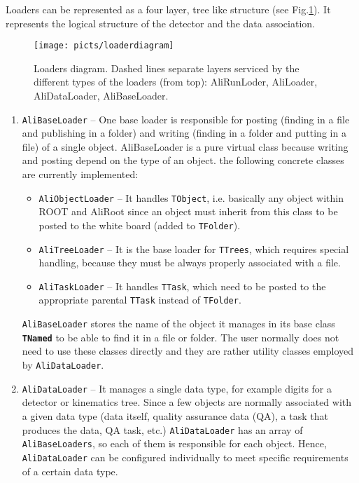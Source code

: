 \documentclass[12pt,a4paper,twoside]{article}
\newcommand{\class}[1]{\texttt{\textbf{#1}}\xspace}
\begin{document}
{Loaders can be represented as a four layer, tree like structure
(see Fig.\ref{cap:soft:loaderdiagram}). It represents the logical structure of
the detector and the data association.
% 
\begin{figure}
  \begin{center}
    \texttt{[image: picts/loaderdiagram]}
  \end{center}
  \caption
  {Loaders diagram. Dashed lines separate layers serviced by  the different types of
    the loaders (from top): AliRunLoder, AliLoader, AliDataLoader, AliBaseLoader.
    \label{cap:soft:loaderdiagram}}
\end{figure}


\begin{enumerate}

\item \texttt{AliBaseLoader} -- One base loader is responsible for posting 
  (finding in a file and publishing in a folder) and writing 
  (finding in a folder and putting in a file) of a single object. 
  AliBaseLoader is a pure virtual class because writing and 
  posting depend on the type of an object. the following concrete classes are currently implemented:
  \begin{itemize}
  \item \texttt{AliObjectLoader} -- It handles \texttt{TObject}, i.e. basically any object 
    within ROOT and AliRoot since an object must inherit from 
    this class to be posted to the white board 
    (added to \texttt{TFolder}).

  \item \texttt{AliTreeLoader}   -- It is the base loader for \texttt{TTrees}, 
    which requires special
    handling, because they must be always properly 
    associated with a file.

  \item \texttt{AliTaskLoader}  -- It handles \texttt{TTask}, which need to be posted to the 
    appropriate parental \texttt{TTask} instead of \texttt{TFolder}.
  \end{itemize}
  \texttt{AliBaseLoader} stores the name of the object it manages in
  its base class \class{TNamed} to be able
  to find it in a file or folder. The user normally does not need to use
  these classes directly and they are rather utility classes employed by
  \texttt{AliDataLoader}.

\item \texttt{AliDataLoader} -- It manages a single data type, for example digits for
  a detector or kinematics tree. 
  Since a few objects are normally associated with a given 
  data type (data itself, quality assurance data (QA), 
  a task that produces the data, QA task, etc.) 
  \texttt{AliDataLoader} has an array of \texttt{AliBaseLoaders}, 
  so each of them is responsible for each object.
  Hence, \texttt{AliDataLoader} can be configured individually to 
  meet specific requirements of a certain data type.


\end{enumerate}}
\end{document}
